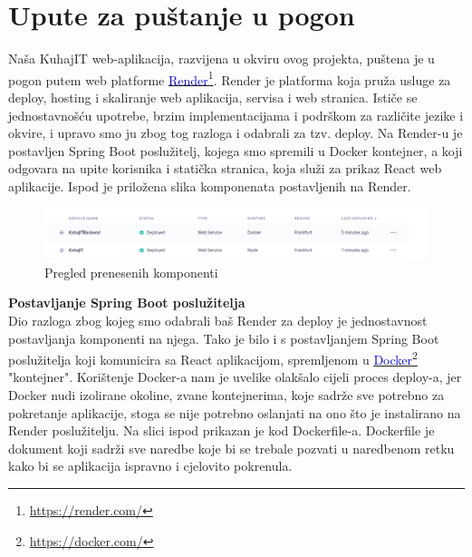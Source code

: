 		\section{Upute za puštanje u pogon}
		Naša KuhajIT web-aplikacija, razvijena u okviru ovog projekta, puštena je u pogon putem web platforme  \textcolor{blue}{\underline{\href{https://render.com/}{\textcolor{blue}{Render}}}}\footnote{\url{https://render.com/}}. Render je platforma koja pruža usluge za deploy, hosting i skaliranje web aplikacija, servisa i web stranica. Ističe se jednostavnošću upotrebe, brzim implementacijama i podrškom za različite jezike i okvire, i upravo smo ju zbog tog razloga i odabrali za tzv. deploy. Na Render-u je postavljen Spring Boot poslužitelj, kojega smo spremili u Docker kontejner, a koji odgovara na upite korisnika i statička stranica, koja služi za prikaz React web aplikacije. Ispod je priložena slika komponenata postavljenih na Render.
		
		
			\begin{figure}[H]
			\includegraphics[scale=0.3]{slike/Render_OVERVIEW.JPG} %
			\centering
			\caption{Pregled prenesenih komponenti}
			\label{Pregled prenesenih komponenti}
		\end{figure}
		
		\textbf{Postavljanje Spring Boot poslužitelja} \\
		Dio razloga zbog kojeg smo odabrali baš Render za deploy je jednostavnost postavljanja komponenti na njega. Tako je bilo i s postavljanjem Spring Boot poslužitelja koji komunicira sa React aplikacijom, spremljenom u \textcolor{blue}{\underline{\href{https://docker.com/}{\textcolor{blue}{Docker}}}}\footnote{\url{https://docker.com/}} "kontejner". Korištenje Docker-a nam je uvelike olakšalo cijeli proces deploy-a, jer Docker nudi izolirane okoline, zvane kontejnerima, koje sadrže sve potrebno za pokretanje aplikacije, stoga se nije potrebno oslanjati na ono što je instalirano na Render poslužitelju. Na slici ispod prikazan je kod Dockerfile-a. Dockerfile je dokument koji sadrži sve naredbe koje bi se trebale pozvati u naredbenom retku kako bi se aplikacija ispravno i cjelovito pokrenula.
		
